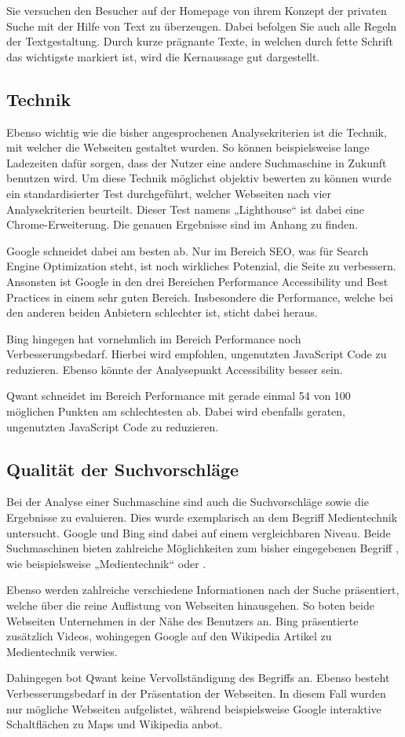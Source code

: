 Sie versuchen den Besucher auf der Homepage von ihrem Konzept der privaten Suche mit der Hilfe von Text zu überzeugen.
Dabei befolgen Sie auch alle Regeln der Textgestaltung\autocite[Seite 5ff]{Maulhardt.20220621b}.
Durch kurze prägnante Texte, in welchen durch fette Schrift das wichtigste markiert ist, wird die Kernaussage gut dargestellt.

\subsection{Technik}
Ebenso wichtig wie die bisher angesprochenen Analysekriterien ist die Technik, mit welcher die Webseiten gestaltet wurden.
So können beispielsweise lange Ladezeiten dafür sorgen, dass der Nutzer eine andere Suchmaschine in Zukunft benutzen wird.
Um diese Technik möglichst objektiv bewerten zu können wurde ein standardisierter Test durchgeführt,
welcher Webseiten nach vier Analysekriterien beurteilt.
Dieser Test namens „Lighthouse“ ist dabei eine Chrome-Erweiterung.
Die genauen Ergebnisse sind im Anhang zu finden.

Google schneidet dabei am besten ab.
Nur im Bereich SEO, was für Search Engine Optimization steht, ist noch wirkliches
Potenzial, die Seite zu verbessern.
Ansonsten ist Google in den drei Bereichen Performance Accessibility und Best Practices in einem sehr guten Bereich.
Insbesondere die Performance, welche bei den anderen beiden Anbietern schlechter ist, sticht dabei heraus.

Bing hingegen hat vornehmlich im Bereich Performance noch Verbesserungsbedarf.
Hierbei wird empfohlen, ungenutzten JavaScript Code zu reduzieren.
Ebenso könnte der Analysepunkt Accessibility besser sein.

Qwant schneidet im Bereich Performance mit gerade einmal 54 von 100 möglichen Punkten am schlechtesten ab.
Dabei wird ebenfalls geraten, ungenutzten JavaScript Code zu reduzieren.

\subsection{Qualität der Suchvorschläge}\label{subsec:qualitat-der-suchvorschlage}
Bei der Analyse einer Suchmaschine sind auch die Suchvorschläge sowie die Ergebnisse zu evaluieren.
Dies wurde exemplarisch an dem Begriff Medientechnik untersucht.
Google und Bing sind dabei auf einem vergleichbaren Niveau.
Beide Suchmaschinen bieten zahlreiche Möglichkeiten zum bisher eingegebenen Begriff  ,
wie beispielsweise „Medientechnik“ oder  .

Ebenso werden zahlreiche verschiedene Informationen nach der Suche präsentiert,
welche über die reine Auflistung von Webseiten hinausgehen.
So boten beide Webseiten Unternehmen in der Nähe des Benutzers an.
Bing präsentierte zusätzlich Videos,
wohingegen Google auf den Wikipedia Artikel zu Medientechnik verwies.

Dahingegen bot Qwant keine Vervollständigung des Begriffs  an.
Ebenso besteht Verbesserungsbedarf in der Präsentation der Webseiten.
In diesem Fall wurden nur mögliche Webseiten aufgelistet,
während beispielsweise Google interaktive Schaltflächen zu Maps und Wikipedia anbot.